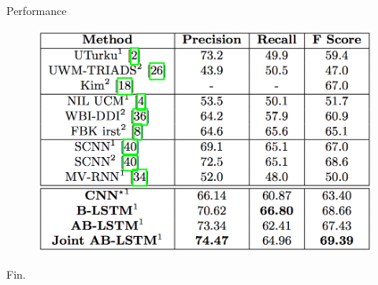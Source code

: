 \documentclass[xcolor={dvipsnames}]{beamer}
\begin{document}
\begin{frame}{\insertsubsection}

\begin{exampleblock}{Performance}
\begin{figure}[ht]
\centering
\includegraphics[scale=0.30]{fig4.png}
\end{figure}
\end{exampleblock}

\end{frame}

\begin{frame}
\begin{center}
\Huge \calligra Fin.
\end{center}
\end{frame}
\end{document}
